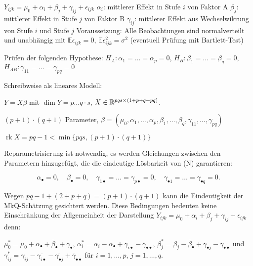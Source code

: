 \documentclass{cheat-sheet}
\newcommand{\E}{\mathbb{E}} %
\DeclareMathOperator{\rk}{rk} %
\begin{document}
\begin{modell}
  $Y_{ijk} = \mu_0 + \alpha_i + \beta_j + \gamma_{ij} + \epsilon_{ijk}$
  $\alpha_i$: mittlerer Effekt in Stufe $i$ von Faktor A
  $\beta_j$: mittlerer Effekt in Stufe $j$ von Faktor B
  $\gamma_{ij}$: mittlerer Effekt aus Wechselwikrung von Stufe $i$ und Stufe $j$
  Voraussetzung: Alle Beobachtungen sind normalverteilt und unabhängig mit $\E \epsilon_{ijk} = 0$, $\E \epsilon_{ijk}^2 = \sigma^2$
  (eventuell Prüfung mit Bartlett-Test)
\end{modell}


Prüfen der folgenden Hypothese:
$H_A : \alpha_1 = \ldots = \alpha_p = 0$,
$H_B : \beta_1 = \ldots = \beta_q = 0$,
$H_{AB} : \gamma_{11} = \ldots = \gamma_{pq} = 0$

Schreibweise als lineares Modell:

$Y = X \beta$ mit $\dim Y = p \dots q \cdot s$, $X \in \mathbb{R}^{pqs \times (1+p+q+pq)}$.

$(p+1) \cdot (q+1)$ Parameter, $\beta = (\mu_0, \alpha_1, \ldots, \alpha_p, \beta_1, \ldots, \beta_q, \gamma_{11}, \ldots, \gamma_{pq})$

$\rk X = pq - 1 < \min \{ pqs, (p+1) \cdot (q+1) \}$

Reparametrisierung ist notwendig, \dh{} es werden Gleichungen zwischen den Parametern hinzugefügt, die die eindeutige Lösbarkeit von (N) garantieren:

\[
  \alpha_\bullet = 0, \quad
  \beta_\bullet = 0, \quad
  \gamma_{1 \bullet} = \ldots = \gamma_{p \bullet} = 0, \quad
  \gamma_{\bullet 1} = \ldots = \gamma_{\bullet q} = 0.
\]

Wegen $pq - 1 + (2 + p + q) = (p+1) \cdot (q+1)$ kann die Eindeutigkeit der MkQ-Schätzung gesichtert werden.
Diese Bedingungen bedeuten keine Einschränkung der Allgemeinheit der Darstellung $Y_{ijk} = \mu_0 + \alpha_i + \beta_j + \gamma_{ij} + \epsilon_{ijk}$ denn:


$\mu_0^* = \mu_0 + \overline{\alpha}_\bullet + \overline{\beta}_\bullet + \overline{\gamma}_\bullet$,
$\alpha_i^* = \alpha_i - \overline{\alpha}_\bullet + \overline{\gamma}_{i \bullet} - \overline{\gamma}_{\bullet \bullet}$,
$\beta_j^* = \beta_j - \overline{\beta}_\bullet + \overline{\gamma}_{\bullet j} - \overline{\gamma}_{\bullet \bullet}$ und
$\gamma_{ij}^* = \gamma_{ij} - \overline{\gamma_{i \bullet}} - \overline{\gamma_{\bullet j}} + \overline{\gamma}_{\bullet \bullet}$
für $i = 1, \ldots, p$, $j = 1, \ldots, q$.
\end{document}
